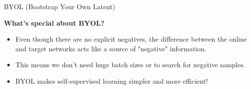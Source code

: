 \begin{frame}[allowframebreaks]{BYOL (Bootstrap Your Own Latent)}
\framebreak

\textbf{What's special about BYOL?}
\begin{itemize}
    \item Even though there are no explicit negatives, the difference between the online and target networks acts like a source of "negative" information.
    \item This means we don't need huge batch sizes or to search for negative samples.
    \item BYOL makes self-supervised learning simpler and more efficient!
\end{itemize}
\end{frame}